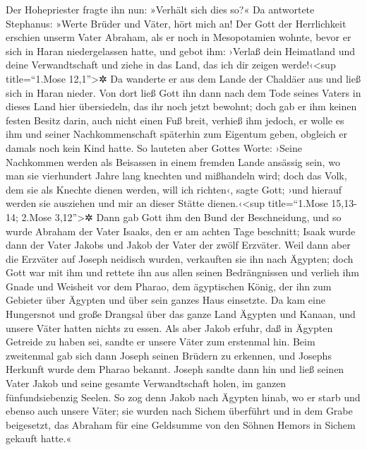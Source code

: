  Der Hohepriester fragte ihn nun: »Verhält sich dies so?«
 Da antwortete Stephanus: »Werte Brüder und Väter, hört
mich an! Der Gott der Herrlichkeit erschien unserm Vater Abraham, als er
noch in Mesopotamien wohnte, bevor er sich in Haran niedergelassen
hatte,  und gebot ihm: ›Verlaß dein Heimatland und deine
Verwandtschaft und ziehe in das Land, das ich dir zeigen
werde!‹\textless sup title=``1.Mose 12,1''\textgreater✲ 
Da wanderte er aus dem Lande der Chaldäer aus und ließ sich in Haran
nieder. Von dort ließ Gott ihn dann nach dem Tode seines Vaters in
dieses Land hier übersiedeln, das ihr noch jetzt bewohnt; 
doch gab er ihm keinen festen Besitz darin, auch nicht einen Fuß breit,
verhieß ihm jedoch, er wolle es ihm und seiner Nachkommenschaft
späterhin zum Eigentum geben, obgleich er damals noch kein Kind hatte.
 So lauteten aber Gottes Worte: ›Seine Nachkommen werden
als Beisassen in einem fremden Lande ansässig sein, wo man sie
vierhundert Jahre lang knechten und mißhandeln wird;  doch
das Volk, dem sie als Knechte dienen werden, will ich richten‹, sagte
Gott; ›und hierauf werden sie ausziehen und mir an dieser Stätte
dienen.‹\textless sup title=``1.Mose 15,13-14; 2.Mose
3,12''\textgreater✲  Dann gab Gott ihm den Bund der
Beschneidung, und so wurde Abraham der Vater Isaaks, den er am achten
Tage beschnitt; Isaak wurde dann der Vater Jakobs und Jakob der Vater
der zwölf Erzväter.  Weil dann aber die Erzväter auf
Joseph neidisch wurden, verkauften sie ihn nach Ägypten; doch Gott war
mit ihm  und rettete ihn aus allen seinen Bedrängnissen
und verlieh ihm Gnade und Weisheit vor dem Pharao, dem ägyptischen
König, der ihn zum Gebieter über Ägypten und über sein ganzes Haus
einsetzte.  Da kam eine Hungersnot und große Drangsal
über das ganze Land Ägypten und Kanaan, und unsere Väter hatten nichts
zu essen.  Als aber Jakob erfuhr, daß in Ägypten Getreide
zu haben sei, sandte er unsere Väter zum erstenmal hin. 
Beim zweitenmal gab sich dann Joseph seinen Brüdern zu erkennen, und
Josephs Herkunft wurde dem Pharao bekannt.  Joseph sandte
dann hin und ließ seinen Vater Jakob und seine gesamte Verwandtschaft
holen, im ganzen fünfundsiebenzig Seelen.  So zog denn
Jakob nach Ägypten hinab, wo er starb und ebenso auch unsere Väter;
 sie wurden nach Sichem überführt und in dem Grabe
beigesetzt, das Abraham für eine Geldsumme von den Söhnen Hemors in
Sichem gekauft hatte.«

